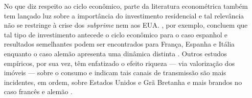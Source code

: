 
No que diz respeito ao ciclo econômico, parte da literatura econométrica também tem lançado luz sobre a importância do investimento residencial e tal relevância não se restringe à crise dos \textit{subprime} nem aos EUA. \textcite{alvarez_does_2010}, por exemplo, concluem que tal tipo de investimento antecede o ciclo econômico para o caso espanhol e resultados semelhantes podem ser encontrados para França, Espanha  e Itália enquanto o caso alemão apresenta uma dinâmica distinta \cites{ferrara_cyclical_2010}{ferrara_common_2010}. 
Outros estudos empíricos, por sua vez, têm enfatizado o efeito riqueza --- via valorização dos imóveis --- sobre o consumo e indicam tais canais de transmissão são mais incidentes, em ordem, sobre Estados Unidos e Grã Bretanha e mais brandos no caso francês e alemão \cites{sastre_assessment_2010}{chauvin_wealth_2010}{bassanetti_effects_2010}{arrondel_housing_2010}.


